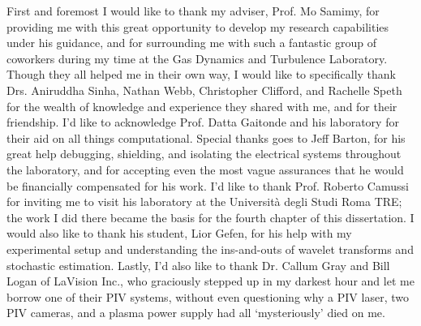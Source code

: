 \begin{acknowledgements}
First and foremost I would like to thank my adviser, Prof. Mo Samimy, for providing me with this great opportunity to develop my research capabilities under his guidance, and for surrounding me with such a fantastic group of coworkers during my time at the Gas Dynamics and Turbulence Laboratory.
Though they all helped me in their own way, I would like to specifically thank Drs. Aniruddha Sinha, Nathan Webb, Christopher Clifford, and Rachelle Speth for the wealth of knowledge and experience they shared with me, and for their friendship.
I'd like to acknowledge Prof. Datta Gaitonde and his laboratory for their aid on all things computational.
Special thanks goes to Jeff Barton, for his great help debugging, shielding, and isolating the electrical systems throughout the laboratory, and for accepting even the most vague assurances that he would be financially compensated for his work. 
I'd like to thank Prof. Roberto Camussi for inviting me to visit his laboratory at the Universit\`{a} degli Studi Roma TRE; the work I did there became the basis for the fourth chapter of this dissertation.
I would also like to thank his student, Lior Gefen, for his help with my experimental setup and understanding the ins-and-outs of wavelet transforms and stochastic estimation.
Lastly, I'd also like to thank Dr. Callum Gray and Bill Logan of LaVision Inc., who graciously stepped up in my darkest hour and let me borrow one of their PIV systems, without even questioning why a PIV laser, two PIV cameras, and a plasma power supply had all `mysteriously' died on me.
\end{acknowledgements}

